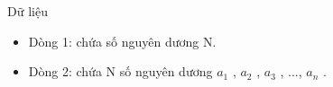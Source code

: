 Dữ liệu  
\begin{itemize}
	\item     Dòng 1: chứa số nguyên dương N.   
	\item     Dòng 2: chứa N số nguyên dương $a_{1}$    , $a_{2}$    , $a_{3}$    , ..., $a_{n}$    .   
\end{itemize}